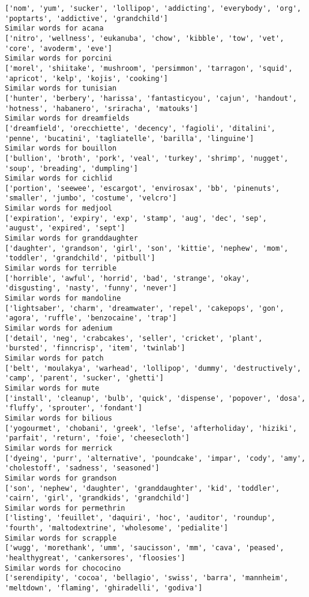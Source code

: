 \documentclass[11pt]{article}
\begin{document}
\begin{Verbatim}[commandchars=\\\{\}]
['nom', 'yum', 'sucker', 'lollipop', 'addicting', 'everybody', 'org', 'poptarts', 'addictive', 'grandchild']
Similar words for acana
['nitro', 'wellness', 'eukanuba', 'chow', 'kibble', 'tow', 'vet', 'core', 'avoderm', 'eve']
Similar words for porcini
['morel', 'shiitake', 'mushroom', 'persimmon', 'tarragon', 'squid', 'apricot', 'kelp', 'kojis', 'cooking']
Similar words for tunisian
['hunter', 'berbery', 'harissa', 'fantasticyou', 'cajun', 'handout', 'hotness', 'habanero', 'sriracha', 'matouks']
Similar words for dreamfields
['dreamfield', 'orecchiette', 'decency', 'fagioli', 'ditalini', 'penne', 'bucatini', 'tagliatelle', 'barilla', 'linguine']
Similar words for bouillon
['bullion', 'broth', 'pork', 'veal', 'turkey', 'shrimp', 'nugget', 'soup', 'breading', 'dumpling']
Similar words for cichlid
['portion', 'seewee', 'escargot', 'envirosax', 'bb', 'pinenuts', 'smaller', 'jumbo', 'costume', 'velcro']
Similar words for medjool
['expiration', 'expiry', 'exp', 'stamp', 'aug', 'dec', 'sep', 'august', 'expired', 'sept']
Similar words for granddaughter
['daughter', 'grandson', 'girl', 'son', 'kittie', 'nephew', 'mom', 'toddler', 'grandchild', 'pitbull']
Similar words for terrible
['horrible', 'awful', 'horrid', 'bad', 'strange', 'okay', 'disgusting', 'nasty', 'funny', 'never']
Similar words for mandoline
['lightsaber', 'charm', 'dreamwater', 'repel', 'cakepops', 'gon', 'agora', 'ruffle', 'benzocaine', 'trap']
Similar words for adenium
['detail', 'neg', 'crabcakes', 'seller', 'cricket', 'plant', 'bursted', 'finncrisp', 'item', 'twinlab']
Similar words for patch
['belt', 'moulakya', 'warhead', 'lollipop', 'dummy', 'destructively', 'camp', 'parent', 'sucker', 'ghetti']
Similar words for mute
['install', 'cleanup', 'bulb', 'quick', 'dispense', 'popover', 'dosa', 'fluffy', 'sprouter', 'fondant']
Similar words for bilious
['yogourmet', 'chobani', 'greek', 'lefse', 'afterholiday', 'hiziki', 'parfait', 'return', 'foie', 'cheesecloth']
Similar words for merrick
['dyeing', 'purr', 'alternative', 'poundcake', 'impar', 'cody', 'amy', 'cholestoff', 'sadness', 'seasoned']
Similar words for grandson
['son', 'nephew', 'daughter', 'granddaughter', 'kid', 'toddler', 'cairn', 'girl', 'grandkids', 'grandchild']
Similar words for permethrin
['listing', 'feuillet', 'daquiri', 'hoc', 'auditor', 'roundup', 'fourth', 'maltodextrine', 'wholesome', 'pedialite']
Similar words for scrapple
['wugg', 'morethank', 'umm', 'saucisson', 'mm', 'cava', 'peased', 'healthygreat', 'cankersores', 'floosies']
Similar words for chococino
['serendipity', 'cocoa', 'bellagio', 'swiss', 'barra', 'mannheim', 'meltdown', 'flaming', 'ghiradelli', 'godiva']

\end{Verbatim}
\end{document}
